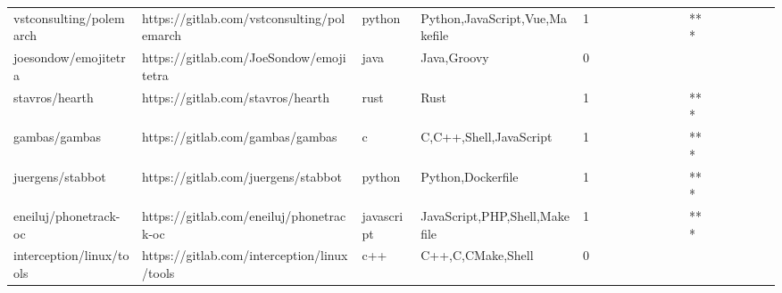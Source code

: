 \begin{tabular}{llllrlllllllllllll}
vstconsulting/polemarch                            &         https://gitlab.com/vstconsulting/polemarch &            python &                     Python,JavaScript,Vue,Makefile &       1 &         &        &           &                &                 &        &           &       *** &          &          &       &              &          \\
joesondow/emojitetra                               &            https://gitlab.com/JoeSondow/emojitetra &              java &                                        Java,Groovy &       0 &         &        &           &                &                 &        &           &           &          &          &       &              &          \\
stavros/hearth                                     &                  https://gitlab.com/stavros/hearth &              rust &                                               Rust &       1 &         &        &           &                &                 &        &           &       *** &          &          &       &              &          \\
gambas/gambas                                      &                   https://gitlab.com/gambas/gambas &                 c &                             C,C++,Shell,JavaScript &       1 &         &        &           &                &                 &        &           &       *** &          &          &       &              &          \\
juergens/stabbot                                   &                https://gitlab.com/juergens/stabbot &            python &                                  Python,Dockerfile &       1 &         &        &           &                &                 &        &           &       *** &          &          &       &              &          \\
eneiluj/phonetrack-oc                              &           https://gitlab.com/eneiluj/phonetrack-oc &        javascript &                      JavaScript,PHP,Shell,Makefile &       1 &         &        &           &                &                 &        &           &       *** &          &          &       &              &          \\
interception/linux/tools                           &        https://gitlab.com/interception/linux/tools &               c++ &                                  C++,C,CMake,Shell &       0 &         &        &           &                &                 &        &           &           &          &          &       &              &          \\

\end{tabular}
